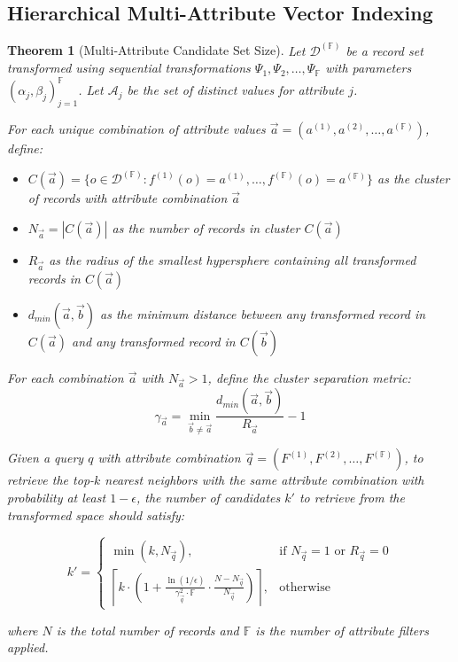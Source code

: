 \documentclass[numbers,sort]{article}
\newtheorem{theorem}{Theorem}
\begin{document}
\subsection{Hierarchical Multi-Attribute Vector Indexing}
\label{sec:multi-attr-indexing}

\begin{theorem}[Multi-Attribute Candidate Set Size]
\label{theo:multi-k-prime}
Let $\mathcal{D}^{(\mathbb{F})}$ be a record set transformed using sequential transformations $\Psi_1, \Psi_2, \ldots, \Psi_{\mathbb{F}}$ with parameters $(\alpha_j, \beta_j)_{j=1}^{\mathbb{F}}$. Let $\mathcal{A}_j$ be the set of distinct values for attribute $j$.

For each unique combination of attribute values $\vec{a} = (a^{(1)}, a^{(2)}, \ldots, a^{(\mathbb{F})})$, define:
\begin{itemize}
\item $C(\vec{a}) = \{o \in \mathcal{D}^{(\mathbb{F})} : f^{(1)}(o) = a^{(1)}, \ldots, f^{(\mathbb{F})}(o) = a^{(\mathbb{F})}\}$ as the cluster of records with attribute combination $\vec{a}$
\item $N_{\vec{a}} = |C(\vec{a})|$ as the number of records in cluster $C(\vec{a})$
\item $R_{\vec{a}}$ as the radius of the smallest hypersphere containing all transformed records in $C(\vec{a})$
\item $d_{min}(\vec{a}, \vec{b})$ as the minimum distance between any transformed record in $C(\vec{a})$ and any transformed record in $C(\vec{b})$
\end{itemize}

For each combination $\vec{a}$ with $N_{\vec{a}} > 1$, define the cluster separation metric:
\begin{equation}
\gamma_{\vec{a}} = \min_{\vec{b} \neq \vec{a}} \frac{d_{min}(\vec{a}, \vec{b})}{R_{\vec{a}}} - 1
\end{equation}

Given a query $q$ with attribute combination $\vec{q} = (F^{(1)}, F^{(2)}, \ldots, F^{(\mathbb{F})})$, to retrieve the top-$k$ nearest neighbors with the same attribute combination with probability at least $1-\epsilon$, the number of candidates $k'$ to retrieve from the transformed space should satisfy:

\begin{equation}
k' =
\begin{cases}
\min(k, N_{\vec{q}}), & \text{if } N_{\vec{q}} = 1 \text{ or } R_{\vec{q}} = 0 \\
\left\lceil k \cdot \left(1 + \frac{\ln(1/\epsilon)}{\gamma_{\vec{q}}^2 \cdot \mathbb{F}} \cdot \frac{N - N_{\vec{q}}}{N_{\vec{q}}}\right) \right\rceil, & \text{otherwise}
\end{cases}
\end{equation}

where $N$ is the total number of records and $\mathbb{F}$ is the number of attribute filters applied.
\end{theorem}
\end{document}
